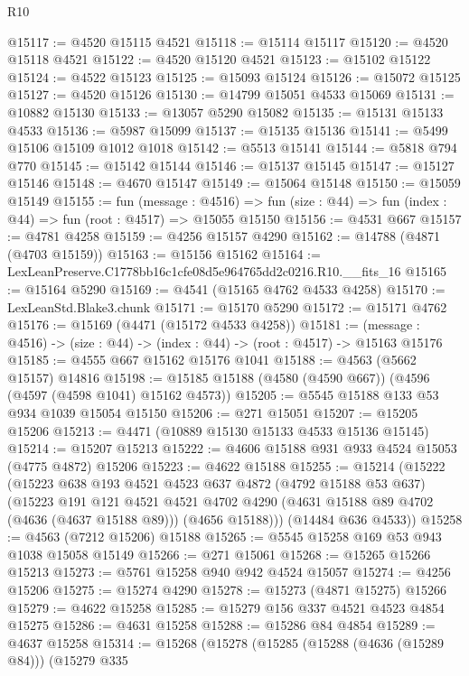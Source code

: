 \begin{lexlean}{R10}
\begin{coremodule}
@15117 := @4520 @15115 @4521
@15118 := @15114 @15117
@15120 := @4520 @15118 @4521
@15122 := @4520 @15120 @4521
@15123 := @15102 @15122
@15124 := @4522 @15123
@15125 := @15093 @15124
@15126 := @15072 @15125
@15127 := @4520 @15126
@15130 := @14799 @15051 @4533 @15069
@15131 := @10882 @15130
@15133 := @13057 @5290 @15082
@15135 := @15131 @15133 @4533
@15136 := @5987 @15099
@15137 := @15135 @15136
@15141 := @5499 @15106 @15109 @1012 @1018
@15142 := @5513 @15141
@15144 := @5818 @794 @770
@15145 := @15142 @15144
@15146 := @15137 @15145
@15147 := @15127 @15146
@15148 := @4670 @15147
@15149 := @15064 @15148
@15150 := @15059 @15149
@15155 := fun (message : @4516) =>
  fun (size : @44) => fun (index : @44) => fun (root : @4517) => @15055 @15150
@15156 := @4531 @667
@15157 := @4781 @4258
@15159 := @4256 @15157 @4290
@15162 := @14788 (@4871 (@4703 @15159))
@15163 := @15156 @15162
@15164 := LexLeanPreserve.C1778bb16c1cfe08d5e964765dd2c0216.R10.__fits_16
@15165 := @15164 @5290
@15169 := @4541 (@15165 @4762 @4533 @4258)
@15170 := LexLeanStd.Blake3.chunk
@15171 := @15170 @5290
@15172 := @15171 @4762
@15176 := @15169 (@4471 (@15172 @4533 @4258))
@15181 := (message : @4516) -> (size : @44) -> (index : @44) -> (root : @4517) -> @15163 @15176
@15185 := @4555 @667 @15162 @15176 @1041
@15188 := @4563 (@5662 @15157) @14816
@15198 := @15185 @15188 (@4580 (@4590 @667)) (@4596 (@4597 (@4598 @1041) @15162 @4573))
@15205 := @5545 @15188 @133 @53 @934 @1039 @15054 @15150
@15206 := @271 @15051
@15207 := @15205 @15206
@15213 := @4471 (@10889 @15130 @15133 @4533 @15136 @15145)
@15214 := @15207 @15213
@15222 := @4606 @15188 @931 @933 @4524 @15053 (@4775 @4872) @15206
@15223 := @4622 @15188
@15255 := @15214
    (@15222
      (@15223
        @638
        @193
        @4521
        @4523
        @637
        @4872
        (@4792 @15188 @53 @637)
        (@15223
          @191
          @121
          @4521
          @4521
          @4702
          @4290
          (@4631 @15188 @89 @4702 (@4636 (@4637 @15188 @89)))
          (@4656 @15188)))
      (@14484 @636 @4533))
@15258 := @4563 (@7212 @15206) @15188
@15265 := @5545 @15258 @169 @53 @943 @1038 @15058 @15149
@15266 := @271 @15061
@15268 := @15265 @15266 @15213
@15273 := @5761 @15258 @940 @942 @4524 @15057
@15274 := @4256 @15206
@15275 := @15274 @4290
@15278 := @15273 (@4871 @15275) @15266
@15279 := @4622 @15258
@15285 := @15279 @156 @337 @4521 @4523 @4854 @15275
@15286 := @4631 @15258
@15288 := @15286 @84 @4854
@15289 := @4637 @15258
@15314 := @15268
    (@15278
      (@15285
        (@15288 (@4636 (@15289 @84)))
        (@15279
          @335

\end{coremodule}
\end{lexlean}
